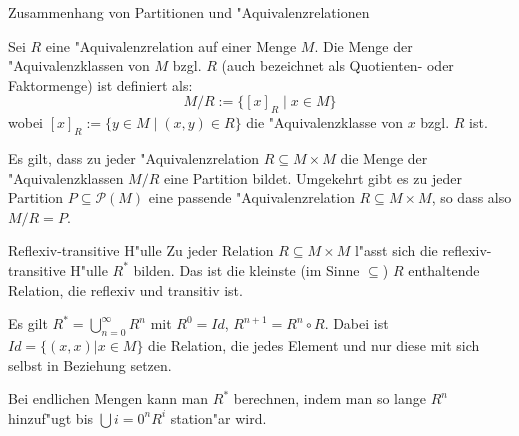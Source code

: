 \documentclass{beamer}
\begin{document}
\begin{frame}{Zusammenhang von Partitionen und "Aquivalenzrelationen}

  \begin{definition}
    Sei $R$ eine "Aquivalenzrelation auf einer Menge $M$. Die Menge der "Aquivalenzklassen von $M$ bzgl. $R$ (auch bezeichnet als Quotienten- oder Faktormenge) ist definiert als:
    \[M/R := \{[x]_R \mid x \in M\}\]
    wobei $[x]_R := \{y \in M \mid (x, y) \in R\}$ die "Aquivalenzklasse von $x$ bzgl. $R$ ist.
  \end{definition}
  Es gilt, dass zu jeder "Aquivalenzrelation $R\subseteq M\times M$ die Menge der "Aquivalenzklassen $M/R$ eine Partition bildet. Umgekehrt gibt es zu jeder Partition $P\subseteq\mathscr{P}(M)$ eine passende "Aquivalenzrelation $R\subseteq M\times M$, so dass also $M/R=P$.
\end{frame}

\begin{frame}{Reflexiv-transitive H"ulle}
Zu jeder Relation $R\subseteq M\times M$ l"asst sich die reflexiv-transitive H"ulle $R^*$ bilden. Das ist die kleinste (im Sinne $\subseteq$) $R$ enthaltende Relation, die reflexiv und transitiv ist.

Es gilt $R^*=\bigcup_{n=0}^\infty R^n$ mit $R^0=Id$, $R^{n+1}=R^n\circ R$. Dabei ist $Id=\{(x,x)|x\in M\}$ die Relation, die jedes Element und nur diese mit sich selbst in Beziehung setzen. 

Bei endlichen Mengen kann man $R^*$ berechnen, indem man so lange $R^n$ hinzuf"ugt bis $\bigcup{i=0}^n R^i$ station"ar wird.
\end{frame}
\end{document}
